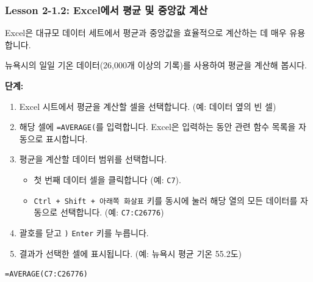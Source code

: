 \documentclass[11pt,a4paper]{article}
\begin{document}
\newpage
\subsubsection*{Lesson 2-1.2: Excel에서 평균 및 중앙값 계산}
Excel은 대규모 데이터 세트에서 평균과 중앙값을 효율적으로 계산하는 데 매우 유용합니다.

\begin{tcolorbox}[examplebox={Excel에서 평균 계산하기 (\texttt{AVERAGE} 함수)}]
뉴욕시의 일일 기온 데이터(26,000개 이상의 기록)를 사용하여 평균을 계산해 봅시다.

\textbf{단계:}
\begin{enumerate}
    \item Excel 시트에서 평균을 계산할 셀을 선택합니다. (예: 데이터 옆의 빈 셀)
    \item 해당 셀에 \texttt{=AVERAGE(}를 입력합니다. Excel은 입력하는 동안 관련 함수 목록을 자동으로 표시합니다.
    \item 평균을 계산할 데이터 범위를 선택합니다.
    \begin{itemize}
        \item 첫 번째 데이터 셀을 클릭합니다 (예: \texttt{C7}).
        \item \texttt{Ctrl + Shift + 아래쪽 화살표} 키를 동시에 눌러 해당 열의 모든 데이터를 자동으로 선택합니다. (예: \texttt{C7:C26776})
    \end{itemize}
    \item 괄호를 닫고 \texttt{)} \texttt{Enter} 키를 누릅니다.
    \item 결과가 선택한 셀에 표시됩니다. (예: 뉴욕시 평균 기온 55.2도)
\end{enumerate}
\begin{lstlisting}[caption={Excel AVERAGE 함수 사용 예시}, label={lst:excel_average}]
=AVERAGE(C7:C26776)
\end{lstlisting}
\end{tcolorbox}
\end{document}
